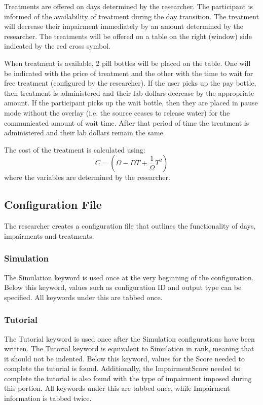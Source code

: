 \documentclass{article}
\begin{document}
Treatments are offered on days determined by the researcher. The participant is informed of the availability of treatment during the day transition. The treatment will decrease their impairment immediately by an amount determined by the researcher. The treatments will be offered on a table on the right (window) side indicated by the red cross symbol.

When treatment is available, 2 pill bottles will be placed on the table. One will be indicated with the price of treatment and the other with the time to wait for free treatment (configured by the researcher). If the user picks up the pay bottle, then treatment is administered and their lab dollars decrease by the appropriate amount. If the participant picks up the wait bottle, then they are placed in pause mode without the overlay (i.e. the source ceases to release water) for the communicated amount of wait time. After that period of time the treatment is administered and their lab dollars remain the same.\newline

The cost of the treatment is calculated using: 
\[ C = (\Omega - DT + \frac{1}{\Omega}T^2)\]
where the variables are determined by the researcher.


\subsection{Configuration File}
The researcher creates a configuration file that outlines the functionality of days, impairments and treatments. 

\subsubsection{Simulation}
The Simulation keyword is used once at the very beginning of the configuration. Below this keyword, values such as configuration ID and output type can
be specified. All keywords under this are tabbed once.

\subsubsection{Tutorial}
The Tutorial keyword is used once after the Simulation configurations have been written. The Tutorial keyword is equivalent to Simulation in rank, meaning that it should not
be indented. Below this keyword, values for the Score needed to complete the tutorial is found. Additionally, the ImpairmentScore needed to complete the tutorial is also found with the type of impairment imposed during this portion. All keywords under this are tabbed once, while Impairment information is tabbed twice.
\end{document}
